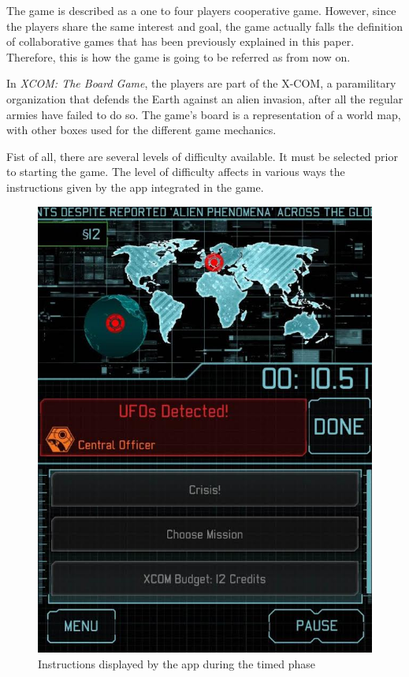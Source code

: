The game is described as a one to four players cooperative game. However, since the players share the same interest and goal, the game actually falls the definition of collaborative games that has been previously explained in this paper. Therefore, this is how the game is going to be referred as from now on.

In \textit{XCOM: The Board Game}, the players are part of the X-COM, a paramilitary organization that defends the Earth against an alien invasion, after all the regular armies have failed to do so. The game's board is a representation of a world map, with other boxes used for the different game mechanics.

Fist of all, there are several levels of difficulty available. It must be selected prior to starting the game. The level of difficulty affects in various ways the instructions given by the app integrated in the game.

\begin{figure}[h]
    \centering
    \includegraphics[scale=0.3]{Images/xcom_boardgame_app.jpg}
    \caption{Instructions displayed by the app during the timed phase}
    \label{fig:XCOMAPP}
\end{figure}


